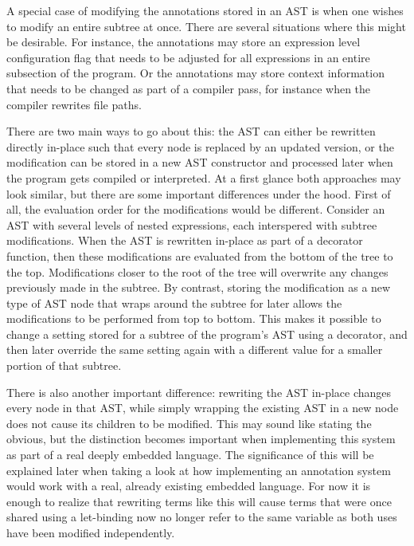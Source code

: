 \documentclass[fontsize=11pt,a4paper,parskip=half,numbers=noenddot]{scrartcl}
\begin{document}

A special case of modifying the annotations stored in an AST is when one wishes
to modify an entire subtree at once. There are several situations where this
might be desirable. For instance, the annotations may store an expression level
configuration flag that needs to be adjusted for all expressions in an entire
subsection of the program. Or the annotations may store context information that
needs to be changed as part of a compiler pass, for instance when the compiler
rewrites file paths.

There are two main ways to go about this: the AST can either be rewritten
directly in-place such that every node is replaced by an updated version, or the
modification can be stored in a new AST constructor and processed later when the
program gets compiled or interpreted. At a first glance both approaches may look
similar, but there are some important differences under the hood. First of all,
the evaluation order for the modifications would be different. Consider an AST
with several levels of nested expressions, each interspered with subtree
modifications. When the AST is rewritten in-place as part of a decorator
function, then these modifications are evaluated from the bottom of the tree to
the top. Modifications closer to the root of the tree will overwrite any changes
previously made in the subtree. By contrast, storing the modification as a new
type of AST node that wraps around the subtree for later allows the
modifications to be performed from top to bottom. This makes it possible to
change a setting stored for a subtree of the program's AST using a decorator,
and then later override the same setting again with a different value for a
smaller portion of that subtree.

There is also another important difference: rewriting the AST in-place changes
every node in that AST, while simply wrapping the existing AST in a new node
does not cause its children to be modified. This may sound like stating the
obvious, but the distinction becomes important when implementing this system as
part of a real deeply embedded language. The significance of this will be
explained later when taking a look at how implementing an annotation system
would work with a real, already existing embedded language. For now it is enough
to realize that rewriting terms like this will cause terms that were once shared
using a let-binding now no longer refer to the same variable as both uses have
been modified independently.
\end{document}
